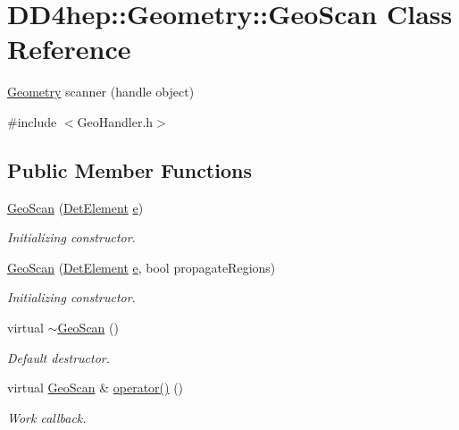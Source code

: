 \hypertarget{class_d_d4hep_1_1_geometry_1_1_geo_scan}{}\section{D\+D4hep\+:\+:Geometry\+:\+:Geo\+Scan Class Reference}
\label{class_d_d4hep_1_1_geometry_1_1_geo_scan}


\hyperlink{namespace_d_d4hep_1_1_geometry}{Geometry} scanner (handle object)  




{\ttfamily \#include $<$Geo\+Handler.\+h$>$}

\subsection*{Public Member Functions}
\begin{DoxyCompactItemize}
\item 
\hyperlink{class_d_d4hep_1_1_geometry_1_1_geo_scan_a71d89e508d1251d7a2488ef3da92cf55}{Geo\+Scan} (\hyperlink{class_d_d4hep_1_1_geometry_1_1_det_element}{Det\+Element} \hyperlink{_volumes_8cpp_a8a9a1f93e9b09afccaec215310e64142}{e})
\begin{DoxyCompactList}\small\item\em Initializing constructor. \end{DoxyCompactList}\item 
\hyperlink{class_d_d4hep_1_1_geometry_1_1_geo_scan_a0bc62c86bafdf3a832f6f81a8fb68bd7}{Geo\+Scan} (\hyperlink{class_d_d4hep_1_1_geometry_1_1_det_element}{Det\+Element} \hyperlink{_volumes_8cpp_a8a9a1f93e9b09afccaec215310e64142}{e}, bool propagate\+Regions)
\begin{DoxyCompactList}\small\item\em Initializing constructor. \end{DoxyCompactList}\item 
virtual \hyperlink{class_d_d4hep_1_1_geometry_1_1_geo_scan_afc8fa45ac2fd4eee7b0a3a8d355ec218}{$\sim$\+Geo\+Scan} ()
\begin{DoxyCompactList}\small\item\em Default destructor. \end{DoxyCompactList}\item 
virtual \hyperlink{class_d_d4hep_1_1_geometry_1_1_geo_scan}{Geo\+Scan} \& \hyperlink{class_d_d4hep_1_1_geometry_1_1_geo_scan_aa6914b5e822dcf712d110644b4c202f1}{operator()} ()
\begin{DoxyCompactList}\small\item\em Work callback. \end{DoxyCompactList}\end{DoxyCompactItemize}
